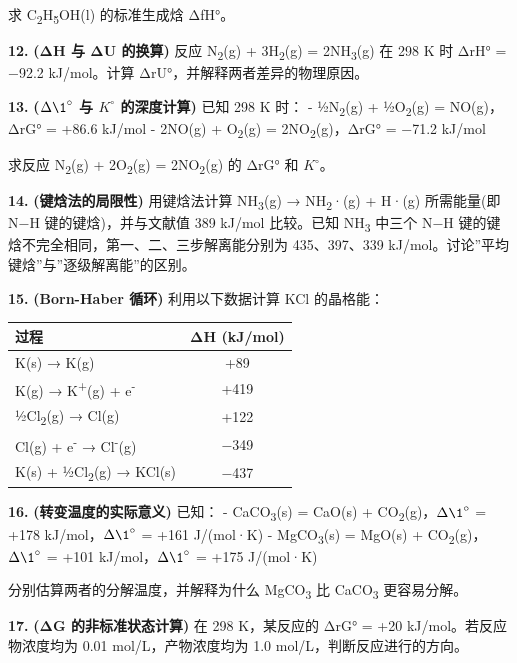 \documentclass[a4paper,11pt]{ctexart}
\newcounter{none}
\begin{document}
求 C\textsubscript{2}H\textsubscript{5}OH(l) 的标准生成焓 ΔfH°。

\textbf{12.} \textbf{(ΔH 与 ΔU 的换算)} 反应 N\textsubscript{2}(g) + 3H\textsubscript{2}(g) = 2NH\textsubscript{3}(g) 在 298 K 时 ΔrH° = −92.2 kJ/mol。计算 ΔrU°，并解释两者差异的物理原因。

\textbf{13.} \textbf{(\(\Delta \1^{\circ}\) 与 \(K^{\circ}\) 的深度计算)} 已知 298 K 时：
- ½N\textsubscript{2}(g) + ½O\textsubscript{2}(g) = NO(g)，ΔrG° = +86.6 kJ/mol
- 2NO(g) + O\textsubscript{2}(g) = 2NO\textsubscript{2}(g)，ΔrG° = −71.2 kJ/mol

求反应 N\textsubscript{2}(g) + 2O\textsubscript{2}(g) = 2NO\textsubscript{2}(g) 的 ΔrG° 和 \(K^{\circ}\)。

\textbf{14.} \textbf{(键焓法的局限性)} 用键焓法计算 NH\textsubscript{3}(g) → NH\textsubscript{2}·(g) + H·(g) 所需能量(即 N−H 键的键焓)，并与文献值 389 kJ/mol 比较。已知 NH\textsubscript{3} 中三个 N−H 键的键焓不完全相同，第一、二、三步解离能分别为 435、397、339 kJ/mol。讨论''平均键焓''与''逐级解离能''的区别。

\textbf{15.} \textbf{(Born-Haber 循环)} 利用以下数据计算 KCl 的晶格能：

{\def\LTcaptype{none} %
\begin{longtable}[]{@{}lc@{}}
\toprule\noalign{}
过程 & ΔH (kJ/mol) \\
\midrule\noalign{}
\endhead
\bottomrule\noalign{}
\endlastfoot
K(s) → K(g) & +89 \\
K(g) → K\textsuperscript{+}(g) + e\textsuperscript{-} & +419 \\
½Cl\textsubscript{2}(g) → Cl(g) & +122 \\
Cl(g) + e\textsuperscript{-} → Cl\textsuperscript{-}(g) & −349 \\
K(s) + ½Cl\textsubscript{2}(g) → KCl(s) & −437 \\
\end{longtable}
}

\textbf{16.} \textbf{(转变温度的实际意义)} 已知：
- CaCO\textsubscript{3}(s) = CaO(s) + CO\textsubscript{2}(g)，\(\Delta \1^{\circ}\) = +178 kJ/mol，\(\Delta \1^{\circ}\) = +161 J/(mol·K)
- MgCO\textsubscript{3}(s) = MgO(s) + CO\textsubscript{2}(g)，\(\Delta \1^{\circ}\) = +101 kJ/mol，\(\Delta \1^{\circ}\) = +175 J/(mol·K)

分别估算两者的分解温度，并解释为什么 MgCO\textsubscript{3} 比 CaCO\textsubscript{3} 更容易分解。

\textbf{17.} \textbf{(ΔG 的非标准状态计算)} 在 298 K，某反应的 ΔrG° = +20 kJ/mol。若反应物浓度均为 0.01 mol/L，产物浓度均为 1.0 mol/L，判断反应进行的方向。
\end{document}
